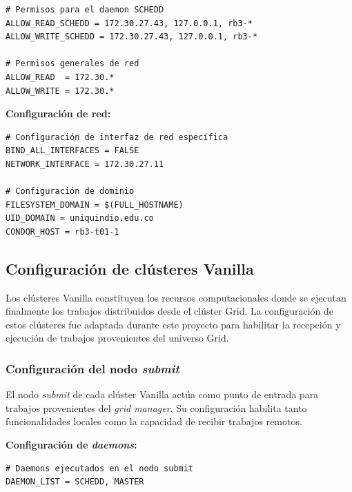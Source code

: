 \begin{verbatim}
# Permisos para el daemon SCHEDD
ALLOW_READ_SCHEDD = 172.30.27.43, 127.0.0.1, rb3-*
ALLOW_WRITE_SCHEDD = 172.30.27.43, 127.0.0.1, rb3-*

# Permisos generales de red
ALLOW_READ  = 172.30.*
ALLOW_WRITE = 172.30.*
\end{verbatim}

\textbf{Configuración de red:}

\begin{verbatim}
# Configuración de interfaz de red específica
BIND_ALL_INTERFACES = FALSE
NETWORK_INTERFACE = 172.30.27.11

# Configuración de dominio
FILESYSTEM_DOMAIN = $(FULL_HOSTNAME)
UID_DOMAIN = uniquindio.edu.co
CONDOR_HOST = rb3-t01-1
\end{verbatim}

\FloatBarrier\subsection{Configuración de clústeres Vanilla}

Los clústeres Vanilla constituyen los recursos computacionales donde se ejecutan finalmente los trabajos distribuidos desde el clúster Grid. La configuración de estos clústeres fue adaptada durante este proyecto para habilitar la recepción y ejecución de trabajos provenientes del universo Grid.

\FloatBarrier\subsubsection{Configuración del nodo \textit{submit}}

El nodo \textit{submit} de cada clúster Vanilla actúa como punto de entrada para trabajos provenientes del \textit{grid manager}. Su configuración habilita tanto funcionalidades locales como la capacidad de recibir trabajos remotos.

\textbf{Configuración de \textit{daemons}:}

\begin{verbatim}
# Daemons ejecutados en el nodo submit
DAEMON_LIST = SCHEDD, MASTER
\end{verbatim}

